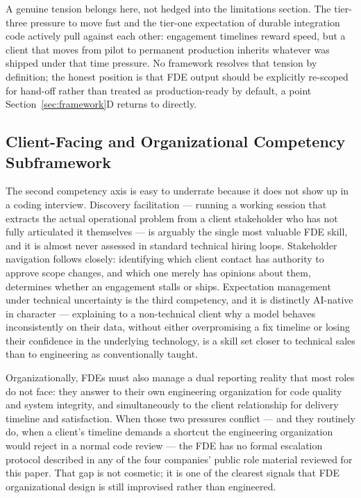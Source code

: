 \documentclass[journal]{IEEEtran}
\begin{document}
A genuine tension belongs here, not hedged into the limitations section. The tier-three pressure to move fast and the tier-one expectation of durable integration code actively pull against each other: engagement timelines reward speed, but a client that moves from pilot to permanent production inherits whatever was shipped under that time pressure. No framework resolves that tension by definition; the honest position is that FDE output should be explicitly re-scoped for hand-off rather than treated as production-ready by default, a point Section~\ref{sec:framework}D returns to directly.

\subsection{Client-Facing and Organizational Competency Subframework}

The second competency axis is easy to underrate because it does not show up in a coding interview. Discovery facilitation --- running a working session that extracts the actual operational problem from a client stakeholder who has not fully articulated it themselves --- is arguably the single most valuable FDE skill, and it is almost never assessed in standard technical hiring loops. Stakeholder navigation follows closely: identifying which client contact has authority to approve scope changes, and which one merely has opinions about them, determines whether an engagement stalls or ships. Expectation management under technical uncertainty is the third competency, and it is distinctly AI-native in character --- explaining to a non-technical client why a model behaves inconsistently on their data, without either overpromising a fix timeline or losing their confidence in the underlying technology, is a skill set closer to technical sales than to engineering as conventionally taught.

Organizationally, FDEs must also manage a dual reporting reality that most roles do not face: they answer to their own engineering organization for code quality and system integrity, and simultaneously to the client relationship for delivery timeline and satisfaction. When those two pressures conflict --- and they routinely do, when a client's timeline demands a shortcut the engineering organization would reject in a normal code review --- the FDE has no formal escalation protocol described in any of the four companies' public role material reviewed for this paper. That gap is not cosmetic; it is one of the clearest signals that FDE organizational design is still improvised rather than engineered.
\end{document}
